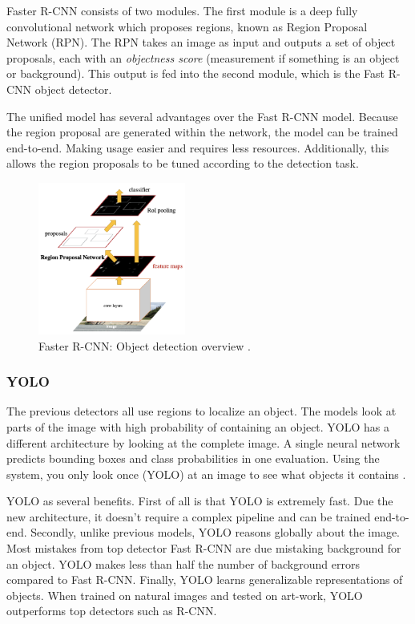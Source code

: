 Faster R-CNN consists of two modules. The first module is a deep fully convolutional network which proposes regions, known as Region Proposal Network (RPN). The RPN takes an image as input and outputs a set of object proposals, each with an \textit{objectness score} (measurement if something is an object or background). This output is fed into the second module, which is the Fast R-CNN object detector. 

The unified model has several advantages over the Fast R-CNN model. Because the region proposal are generated within the network, the model can be trained end-to-end. Making usage easier and requires less resources. Additionally, this allows the region proposals to be tuned according to the detection task.


\begin{figure}[ht]
\begin{center}
\includegraphics[height=5cm,keepaspectratio]{images/2_literature/faster-r-cnn.png}
\end{center}
\caption{Faster R-CNN: Object detection overview \cite{Ren2015}.}
\end{figure}


\subsubsection{YOLO}
The previous detectors all use regions to localize an object. The models look at parts of the image with high probability of containing an object. YOLO has a different architecture by looking at the complete image. A single neural network predicts bounding boxes and class probabilities in one evaluation. Using the system, you only look once (YOLO) at an image to see what objects it contains \cite{Redmon2016}.

YOLO as several benefits. First of all is that YOLO is extremely fast. Due the new architecture, it doesn't require a complex pipeline and can be trained end-to-end. Secondly, unlike previous models, YOLO reasons globally about the image. Most mistakes from top detector Fast R-CNN are due mistaking background for an object. YOLO makes less than half the number of background errors compared to Fast R-CNN. Finally, YOLO learns generalizable representations of objects. When trained on natural images and tested on art-work, YOLO outperforms top detectors such as R-CNN. 

